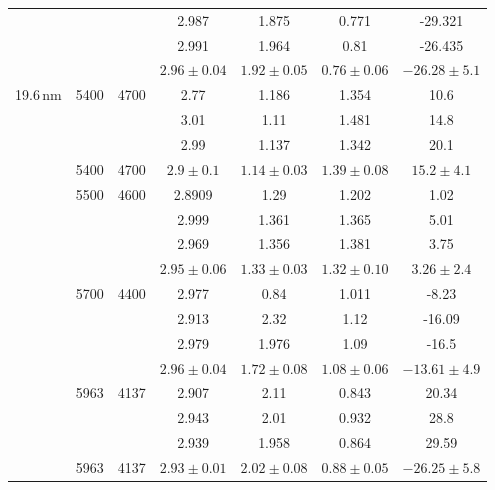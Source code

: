 \documentclass{article}
\begin{document}
\begin{table}
\begin{tabular}{|c|c|c|c|c|c|c|}
              &     &              & 2.987        & 1.875        & 0.771      & -29.321  \\
              &     &              & 2.991        & 1.964        & 0.81       & -26.435  \\
        \hline
              &     &              & $2.96 \pm 0.04$ & $1.92 \pm 0.05$ & $0.76 \pm 0.06$ & $-26.28\pm 5.1$ \\
      \hline
     19.6\,nm &5400 & 4700         & 2.77         & 1.186       & 1.354       & 10.6 \\
              &     &              & 3.01         & 1.11        & 1.481       & 14.8 \\
              &     &              & 2.99         & 1.137       & 1.342       & 20.1 \\
      \hline
              &5400 & 4700 & $2.9  \pm 0.1$  & $1.14 \pm 0.03$ & $1.39 \pm 0.08$ & $15.2 \pm 4.1$ \\
      \hline
              &5500 & 4600         & 2.8909       & 1.29        & 1.202      & 1.02 \\
              &     &              & 2.999        & 1.361       & 1.365      & 5.01 \\
              &     &              & 2.969        & 1.356       & 1.381      & 3.75 \\
     \hline
              &     &      & $2.95 \pm 0.06$ & $1.33 \pm 0.03$ & $1.32 \pm 0.10$ & $3.26 \pm 2.4$ \\
     \hline
              &5700 & 4400         & 2.977        & 0.84        & 1.011      & -8.23 \\
              &     &              & 2.913        & 2.32        & 1.12       & -16.09 \\
              &     &              & 2.979        & 1.976       & 1.09       & -16.5 \\
     \hline
              &     &     & $2.96 \pm 0.04$ & $1.72 \pm 0.08$ & $1.08 \pm 0.06$ & $-13.61\pm4.9$ \\
     \hline
              &5963 & 4137         & 2.907       &  2.11             & 0.843       & 20.34 \\
              &     &              & 2.943       &  2.01             & 0.932       & 28.8 \\
              &     &              & 2.939       & 1.958             & 0.864       & 29.59 \\
     \hline
              &5963 & 4137 & $2.93 \pm 0.01$ & $2.02 \pm 0.08$ & $0.88 \pm 0.05$ & $-26.25\pm5.8$ \\
       \hline
    \end{tabular}
    \label{Tab-1}
\end{table}
\end{document}
